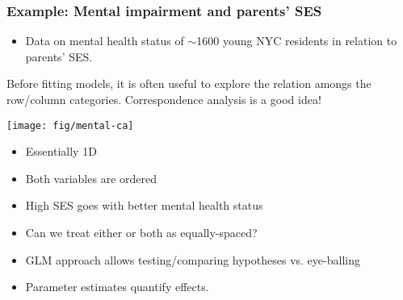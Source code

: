 \begin{frame}
  \frametitle{Example: Mental impairment and parents' SES}
  \begin{itemize}
	\item \cite{Srole-etal:78} Data on mental health status of $\sim$1600
	young NYC residents in relation to parents' SES.
%	
	
  \end{itemize}
\end{frame}

\begin{frame}
Before fitting models, it is often useful to explore the relation amongs the row/column
categories.  Correspondence analysis is a good idea!


 \begin{minipage}[c]{.6\linewidth}
  \texttt{[image: fig/mental-ca]}
 \end{minipage}%
 \hfill
 \begin{minipage}[c]{.39\linewidth}
 	\begin{itemize}
		\item Essentially 1D
		\item Both variables are ordered
		\item High SES goes with better mental health status
		\item Can we treat either or both as equally-spaced?
		\item GLM approach allows testing/comparing hypotheses vs. eye-balling
		\item Parameter estimates quantify effects.
	\end{itemize}

 \end{minipage}
\end{frame}

